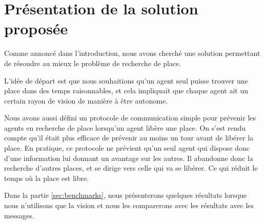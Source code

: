 \section{Présentation de la solution proposée}
\label{sec:presentation}

Comme annoncé dans l'introduction, nous avons cherché une solution
permettant de résoudre au mieux le problème de recherche de place.

L'idée de départ est que nous souhaitions qu'un agent seul puisse
trouver une place dans des temps raisonnables, et cela impliquait que
chaque agent ait un certain rayon de vision de manière à être
autonome.

Nous avons aussi défini un protocole de communication simple pour
prévenir les agents en recherche de place lorsqu'un agent libère une
place. On s'est rendu compte qu'il était plus efficace de prévenir au
moins un tour avant de libérer la place. En pratique, ce protocole ne
prévient qu'un seul agent qui dispose donc d'une information lui
donnant un avantage sur les autres. Il abandonne donc la recherche
d'autres places, et se dirige vers celle qui va se libérer. Ce qui
réduit le temps où la place est libre.

Dans la partie \ref{sec:benchmarks}, nous présenterons quelques
résultats lorsque nous n'utilisons que la vision et nous les
comparerons avec les résultats avec les messages.

